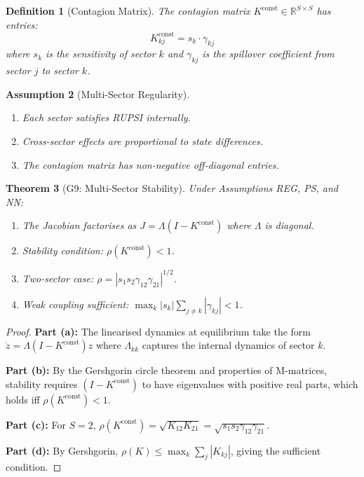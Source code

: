 \documentclass[12pt]{article}
\newtheorem{theorem}{Theorem}[section]
\newtheorem{definition}[theorem]{Definition}
\newtheorem{assumption}[theorem]{Assumption}
\newcommand{\R}{\mathbb{R}}
\begin{document}
\begin{definition}[Contagion Matrix]
The \emph{contagion matrix} $K^{\mathrm{const}} \in \R^{S \times S}$ has entries:
\[
K^{\mathrm{const}}_{kj} = s_k \cdot \gamma_{kj}
\]
where $s_k$ is the sensitivity of sector $k$ and $\gamma_{kj}$ is the spillover coefficient from sector $j$ to sector $k$.
\end{definition}

\begin{assumption}[Multi-Sector Regularity]
\label{ass:multi-sector}
\begin{enumerate}
    \item[\textbf{(REG)}] Each sector satisfies RUPSI internally.
    \item[\textbf{(PS)}] Cross-sector effects are proportional to state differences.
    \item[\textbf{(NN)}] The contagion matrix has non-negative off-diagonal entries.
\end{enumerate}
\end{assumption}

\begin{theorem}[G9: Multi-Sector Stability]
\label{thm:g9}
Under Assumptions REG, PS, and NN:
\begin{enumerate}
    \item[(a)] The Jacobian factorises as $J = \Lambda(I - K^{\mathrm{const}})$ where $\Lambda$ is diagonal.
    \item[(b)] Stability condition: $\rho(K^{\mathrm{const}}) < 1$.
    \item[(c)] Two-sector case: $\rho = |s_1 s_2 \gamma_{12} \gamma_{21}|^{1/2}$.
    \item[(d)] Weak coupling sufficient: $\max_k |s_k| \sum_{j \neq k} |\gamma_{kj}| < 1$.
\end{enumerate}
\end{theorem}

\begin{proof}
\textbf{Part (a):} The linearised dynamics at equilibrium take the form $\dot{z} = \Lambda(I - K^{\mathrm{const}}) z$ where $\Lambda_{kk}$ captures the internal dynamics of sector $k$.

\textbf{Part (b):} By the Gershgorin circle theorem and properties of M-matrices, stability requires $(I - K^{\mathrm{const}})$ to have eigenvalues with positive real parts, which holds iff $\rho(K^{\mathrm{const}}) < 1$.

\textbf{Part (c):} For $S = 2$, $\rho(K^{\mathrm{const}}) = \sqrt{K_{12} K_{21}} = \sqrt{s_1 s_2 \gamma_{12} \gamma_{21}}$.

\textbf{Part (d):} By Gershgorin, $\rho(K) \leq \max_k \sum_j |K_{kj}|$, giving the sufficient condition.
\end{proof}
\end{document}
